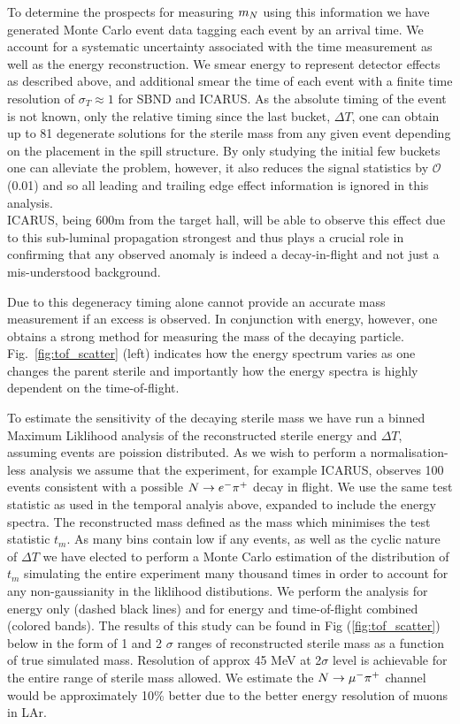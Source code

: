 \documentclass[11pt, a4paper]{article}
\newcommand{\reffig}[1]{Fig.~\ref{#1}}
\def\ster{\ensuremath N}
\begin{document}
To determine the prospects for measuring $m_{\ster}$ using this information we
have generated Monte Carlo event data tagging each event by an arrival time.
We account for a systematic uncertainty associated with the time measurement as
well as the energy reconstruction. We smear energy to represent detector
effects as described above, and additional smear the time of each event with a
finite time resolution of $\sigma_T  \approx 1$ for SBND and ICARUS. As the
absolute timing of the event is not known, only the relative timing since the
last bucket, $\Delta T$, one can obtain up to 81 degenerate solutions for the
sterile mass from any given event depending on the placement in the spill
structure. By only studying the initial few buckets one can alleviate the
problem, however, it also reduces the signal statistics by $\mathcal{O}$(0.01)
and so all leading and trailing edge effect information is ignored in this analysis. \\

ICARUS, being 600m from the target hall, will be able to observe this effect
due to this sub-luminal propagation strongest and thus plays a crucial role in
confirming that any observed anomaly is indeed a decay-in-flight and not just a
mis-understood background.

Due to this degeneracy timing alone cannot provide an accurate mass measurement
if an excess is observed. In conjunction with energy, however, one obtains a
strong method for measuring the mass of the decaying particle.
\reffig{fig:tof_scatter} (left) indicates how the energy spectrum varies as one
changes the parent sterile and importantly how the energy spectra is highly
dependent on the time-of-flight. 

To estimate the sensitivity of the decaying sterile mass we have run a binned
Maximum Liklihood analysis of the reconstructed sterile energy and $\Delta T$,
assuming events are poission distributed. As we wish to perform a
normalisation-less analysis we assume that the experiment, for example ICARUS,
observes 100 events consistent with a possible $\ster\rightarrow e^- \pi^+$
decay in flight. We use the same test statistic as used in the temporal analyis
above, expanded to include the energy spectra. The reconstructed mass defined
as the mass which minimises the test statistic $t_m$. As many bins contain low
if any events, as well as the cyclic nature of $\Delta T$ we have elected to
perform a Monte Carlo estimation of the distribution of $t_m$ simulating the
entire experiment many thousand times in order to account for any
non-gaussianity in the liklihood distibutions. We perform the analysis for
energy only (dashed black lines) and for energy and time-of-flight combined
(colored bands). The results of this study can be found in Fig
(\ref{fig:tof_scatter}) below in the form of 1 and 2 $\sigma$ ranges of
reconstructed sterile mass as a function of true simulated mass. Resolution of
approx 45 MeV at 2$\sigma$ level is achievable for the entire range of sterile
mass allowed. We estimate the $\ster\rightarrow \mu^- \pi^+$ channel would be
approximately 10\% better due to the better energy resolution of muons in LAr.  
\end{document}
